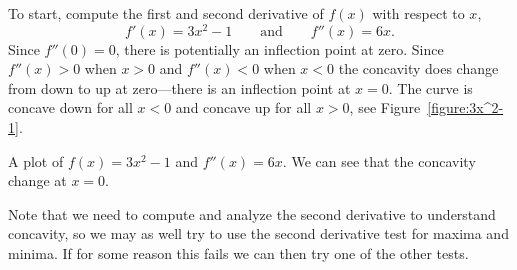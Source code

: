 \begin{solution}
To start, compute the first and second derivative of $f(x)$ with
respect to $x$,
\[
f'(x)=3x^2-1\qquad\text{and}\qquad f''(x)=6x.
\]
Since $f''(0)=0$, there is potentially an inflection point at
zero. Since $f''(x)>0$ when $x>0$ and $f''(x)<0$ when $x<0$ the
concavity does change from down to up at zero---there is an inflection
point at $x=0$. The curve is concave down for all $x<0$ and
concave up for all $x>0$, see Figure~\ref{figure:3x^2-1}.
\end{solution}
\begin{marginfigure}[0in]
\caption{A plot of $f(x) = 3x^2-1$ and $f''(x) = 6x$. We can see that
  the concavity change at $x=0$.}
\label{figure:3x^2-1}
\end{marginfigure}

Note that we need to compute and analyze the second derivative to
understand concavity, so we may as well try to use the second
derivative test for maxima and minima. If for some reason this fails
we can then try one of the other tests.

